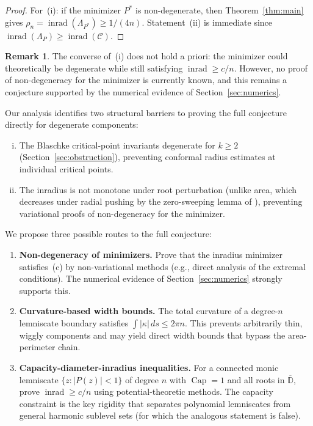 \documentclass[11pt,a4paper]{amsart}
\theoremstyle{definition}
\newtheorem{remark}[theorem]{Remark}
\newcommand{\D}{\mathbb{D}}
\newcommand{\abs}[1]{\lvert #1 \rvert}
\newcommand{\inrad}{\operatorname{inrad}}
\renewcommand{\Cap}{\operatorname{Cap}}
\begin{document}
\begin{proof}
For~(i): if the minimizer $P^*$ is non-degenerate, then
Theorem~\ref{thm:main} gives
$\rho_n = \inrad(\Lambda_{P^*}) \geq 1/(4n)$.
Statement~(ii) is immediate since
$\inrad(\Lambda_P) \geq \inrad(\mathcal{C})$.
\end{proof}

\begin{remark}
The converse of~(i) does not hold a priori: the minimizer could
theoretically be degenerate while still satisfying $\inrad \geq c/n$.
However, no proof of non-degeneracy for the minimizer is currently known,
and this remains a conjecture supported by the numerical evidence of
Section~\ref{sec:numerics}.
\end{remark}

Our analysis identifies two structural barriers to proving the
full conjecture directly for degenerate components:
\begin{enumerate}[(i)]
  \item The Blaschke critical-point invariants degenerate for
    $k \geq 2$ (Section~\ref{sec:obstruction}), preventing
    conformal radius estimates at individual critical points.
  \item The inradius is not monotone under root perturbation
    (unlike area, which decreases under radial pushing by the
    zero-sweeping lemma of \cite{KLR25}), preventing variational
    proofs of non-degeneracy for the minimizer.
\end{enumerate}

We propose three possible routes to the full conjecture:
\begin{enumerate}
  \item \textbf{Non-degeneracy of minimizers.}
    Prove that the inradius minimizer satisfies~(c) by
    non-variational methods (e.g., direct analysis of the
    extremal conditions).  The numerical evidence of
    Section~\ref{sec:numerics} strongly supports this.

  \item \textbf{Curvature-based width bounds.}
    The total curvature of a degree-$n$ lemniscate boundary
    satisfies $\int \abs{\kappa}\,ds \leq 2\pi n$.
    This prevents arbitrarily thin, wiggly components and may
    yield direct width bounds that bypass the area-perimeter chain.

  \item \textbf{Capacity-diameter-inradius inequalities.}
    For a connected monic lemniscate $\{z : \abs{P(z)} < 1\}$
    of degree $n$ with $\Cap = 1$ and all roots in $\overline{\D}$,
    prove $\inrad \geq c/n$ using potential-theoretic methods.
    The capacity constraint is the key rigidity that separates
    polynomial lemniscates from general harmonic sublevel sets
    (for which the analogous statement is false).
\end{enumerate}
\end{document}
